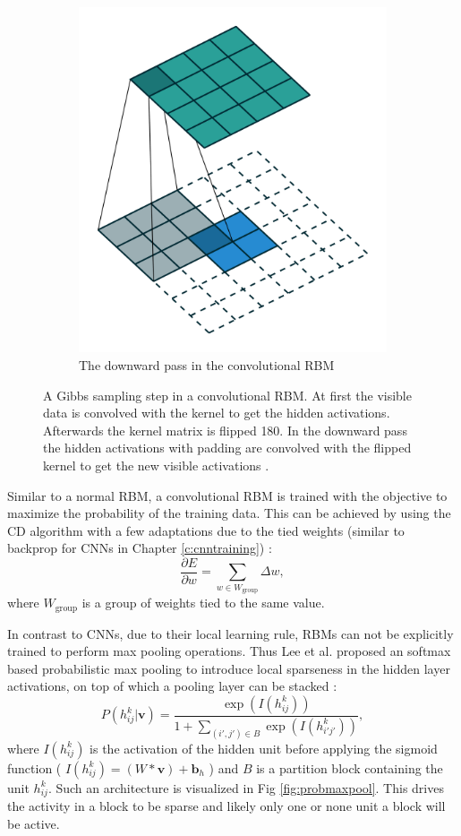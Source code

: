 \begin{figure}
\begin{subfigure}[t]{.30\textwidth}
  		\includegraphics[width=.8\linewidth]{imgs/crbm_padding2.png}
  		\caption{The downward pass in the convolutional RBM}
  		\label{fig:convrbmsub3}
	\end{subfigure}
	\caption[A Gibbs sampling step in a convolutional RBM.]{A Gibbs sampling step in a convolutional RBM. At first the visible data is convolved with the kernel to get the hidden activations. Afterwards the kernel matrix is flipped 180\textdegree . In the downward pass the hidden activations with padding are convolved with the flipped kernel to get the new visible activations \cite{convImg}.}
	\label{fig:convrbm}
\end{figure}


Similar to a normal RBM, a convolutional RBM is trained with the objective to maximize the probability of the training data.
This can be achieved by using the CD algorithm with a few adaptations due to the tied weights (similar to backprop for CNNs in Chapter \ref{c:cnntraining}) \cite{NorouziM2009}: 
\[
\frac{\partial E}{\partial w} = \sum_{w \in W_{\text{group}}} \Delta w,
\]
where $W_{\text{group}}$ is a group of weights tied to the same value.

In contrast to CNNs, due to their local learning rule, RBMs can not be explicitly trained to perform max pooling operations.
Thus Lee et al. proposed an softmax based probabilistic max pooling to introduce local sparseness in the hidden layer activations, on top of which a pooling layer can be stacked \cite{lee2009convolutional}:
\[
P(h^k_{ij} | \textbf{v}) = \frac{\exp(I(h^k_{ij}))}{1 + \sum_{(i',j') \in B} \exp(I(h^k_{i'j'}))},
\]
where $I(h^k_{ij})$ is the activation of the hidden unit before applying the sigmoid function ( $I(h^k_{ij})=(W * \textbf{v}) + \textbf{b}_{h}$ ) and $B$ is a partition block containing the unit $h^k_{ij}$. 
Such an architecture is visualized in Fig \ref{fig:probmaxpool}.
This drives the activity in a block to be sparse and likely only one or none unit a block will be active.

